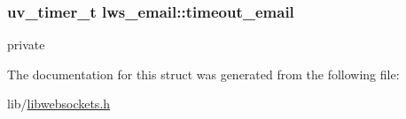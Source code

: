 \subsubsection[{\texorpdfstring{timeout\+\_\+email}{timeout\_email}}]{\setlength{\rightskip}{0pt plus 5cm}uv\+\_\+timer\+\_\+t lws\+\_\+email\+::timeout\+\_\+email}\hypertarget{structlws__email_a77723e2f2b940b1c879ef5e1cd88c2be}{}\label{structlws__email_a77723e2f2b940b1c879ef5e1cd88c2be}
private 

The documentation for this struct was generated from the following file\+:\begin{DoxyCompactItemize}
\item 
lib/\hyperlink{libwebsockets_8h}{libwebsockets.\+h}\end{DoxyCompactItemize}
